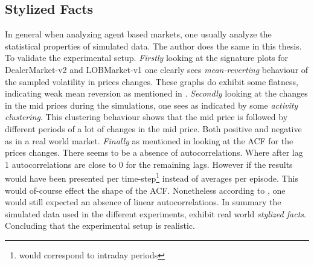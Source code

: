 \documentclass{kththesis}
\theoremstyle{definition}
\begin{document}
\subsection*{Stylized Facts}
In general when analyzing agent based markets, one usually analyze the statistical properties of simulated data. The author does the same in this thesis. To validate the  experimental setup. \textit{Firstly} looking at the signature plots for DealerMarket-v2 and LOBMarket-v1 one clearly sees \textit{mean-reverting} behaviour of the sampled volatility in prices changes. These graphs do exhibit some flatness, indicating weak mean reversion as mentioned in \parencite{bouchaud2018trades}. \textit{Secondly} looking at the changes in the mid prices during the simulations, one sees as indicated by \textcite{bouchaud2018trades} some \textit{activity clustering}. 
\newline
\newline
This clustering behaviour shows that the mid price is followed by different periods of a lot of changes in the mid price. Both positive and negative as in a real world market. \textit{Finally} as mentioned in \parencite{cont2001empirical} looking at the ACF for the prices changes. There seems to be a absence of autocorrelations. Where after lag 1 autocorrelations are close to 0 for the remaining lags. However if the results would have been presented per time-step\footnote{would correspond to intraday periods} instead of averages per episode. This would of-course effect the shape of the ACF. Nonetheless according to \textcite{cont2001empirical}, one would still expected an absence of linear autocorrelations. In summary the simulated data used in the different experiments, exhibit real world \textit{stylized facts}. Concluding that the experimental setup is realistic.
\end{document}
